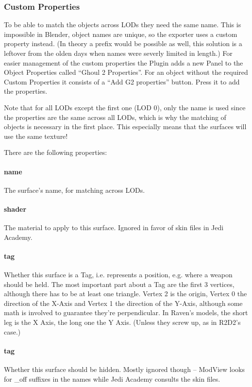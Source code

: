 \documentclass[a4paper,10pt]{article}
\begin{document}
 \subsubsection{Custom Properties}
 
 To be able to match the objects across LODs they need the same name. This is impossible in Blender, object
 names are unique, so the exporter uses a custom property instead. (In theory a prefix would be possible as
 well, this solution is a leftover from the olden days when names were severly limited in length.) For easier
 management of the custom properties the Plugin adds a new Panel to the Object Properties called ``Ghoul 2
 Properties''. For an object without the required Custom Properties it consists of a ``Add G2 properties'' button.
 Press it to add the properties.
 
 Note that for all LODs except the first one (LOD 0), only the name is used since the properties are
 the same across all LODs, which is why the matching of objects is necessary in the first place. This
 especially means that the surfaces will use the same texture!
 
 There are the following properties:
 
 \paragraph*{name}
 The surface's name, for matching across LODs.
 
 \paragraph*{shader}
 The material to apply to this surface. Ignored in favor of skin files in Jedi Academy.
 
 \paragraph*{tag}
 Whether this surface is a Tag, i.e. represents a position, e.g. where a weapon should be held. The most
 important part about a Tag are the first 3 vertices, although there has to be at least one triangle. Vertex 2
 is the origin, Vertex 0 the direction of the X-Axis and Vertex 1 the direction of the Y-Axis, although some
 math is involved to guarantee they're perpendicular. In Raven's models, the short leg is the X Axis, the
 long one the Y Axis. (Unless they screw up, as in R2D2's case.)
 
 \paragraph*{tag}
 Whether this surface should be hidden. Mostly ignored though -- ModView looks for \_off suffixes in the names
 while Jedi Academy consults the skin files.
 
\end{document}
